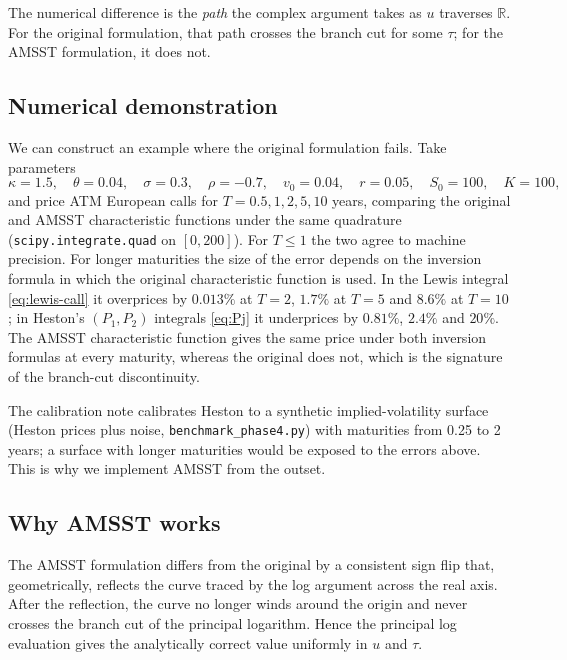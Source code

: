 \documentclass[11pt]{article}
\theoremstyle{plain}
\theoremstyle{definition}
\theoremstyle{remark}
\begin{document}
The numerical difference is the \emph{path} the complex argument takes as \(u\) traverses \(\mathbb{R}\). For the original formulation, that path crosses the branch cut for some \(\tau\); for the AMSST formulation, it does not.

\subsection{Numerical demonstration}

We can construct an example where the original formulation fails. Take parameters
\[
    \kappa = 1.5, \quad \theta = 0.04, \quad \sigma = 0.3, \quad \rho = -0.7, \quad v_0 = 0.04, \quad r = 0.05, \quad S_0 = 100, \quad K = 100,
\]
and price ATM European calls for \(T = 0.5, 1, 2, 5, 10\) years, comparing the original and AMSST characteristic functions under the same quadrature (\texttt{scipy.integrate.quad} on \([0, 200]\)). For \(T \leq 1\) the two agree to machine precision. For longer maturities the size of the error depends on the inversion formula in which the original characteristic function is used. In the Lewis integral \eqref{eq:lewis-call} it overprices by \(0.013\%\) at \(T = 2\), \(1.7\%\) at \(T = 5\) and \(8.6\%\) at \(T = 10\); in Heston's \((P_1, P_2)\) integrals \eqref{eq:Pj} it underprices by \(0.81\%\), \(2.4\%\) and \(20\%\). The AMSST characteristic function gives the same price under both inversion formulas at every maturity, whereas the original does not, which is the signature of the branch-cut discontinuity.

The calibration note calibrates Heston to a synthetic implied-volatility surface (Heston prices plus noise, \texttt{benchmark\_phase4.py}) with maturities from 0.25 to 2 years; a surface with longer maturities would be exposed to the errors above. This is why we implement AMSST from the outset.

\subsection{Why AMSST works}

The AMSST formulation differs from the original by a consistent sign flip that, geometrically, reflects the curve traced by the log argument across the real axis. After the reflection, the curve no longer winds around the origin and never crosses the branch cut of the principal logarithm. Hence the principal log evaluation gives the analytically correct value uniformly in \(u\) and \(\tau\).
\end{document}
